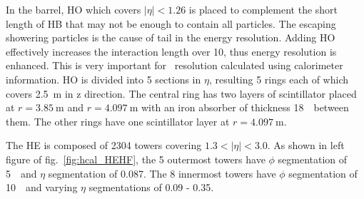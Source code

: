 In the barrel, HO which covers $|\eta|<1.26$ is placed to complement 
the short length of HB that may not be enough 
to contain all particles. The escaping showering particles 
is the cause of tail in the energy resolution. Adding HO effectively increases 
the interaction length over 10, thus energy resolution is enhanced.
This is very important for \met\ resolution calculated using calorimeter information. 
HO is divided into 5 sections in $\eta$, resulting 5 rings 
each of which covers 2.5~m in z direction. 
The central ring has two layers of scintillator placed at $r=3.85~\textrm{m}$ and 
$r=4.097~\textrm{m}$ with an iron absorber of thickness 18~\cm\ between them. 
The other rings have one scintillator layer at $r=4.097~\textrm{m}$.

The HE is composed of 2304 towers covering $1.3 < |\eta| < 3.0$. 
As shown in left figure of fig.~\ref{fig:hcal_HEHF}, the 5 outermost towers have 
$\phi$ segmentation of 5~\dg\ and $\eta$ segmentation of 0.087. 
The 8 innermost towers have 
$\phi$ segmentation of 10~\dg\ and varying $\eta$ segmentations of 0.09 - 0.35. 


